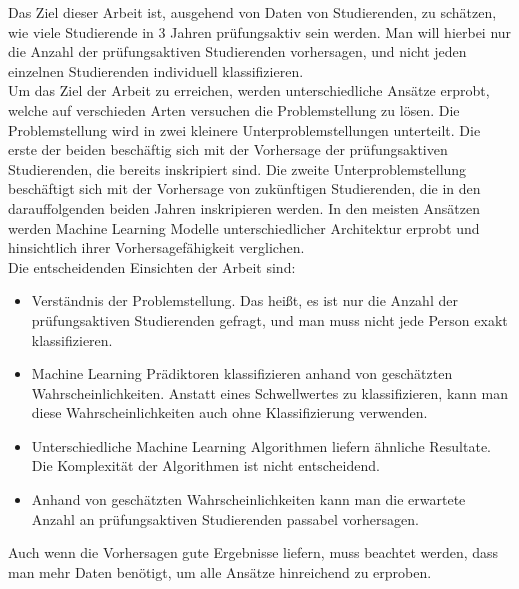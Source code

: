 

Das Ziel dieser Arbeit ist, ausgehend von Daten von Studierenden, zu sch\"atzen, wie viele
Studierende in 3 Jahren pr\"ufungsaktiv sein werden. Man will hierbei nur die Anzahl der pr\"ufungsaktiven Studierenden vorhersagen,
und nicht jeden einzelnen Studierenden individuell klassifizieren. \\

Um das Ziel der Arbeit zu erreichen, werden unterschiedliche Ans\"atze erprobt, welche auf verschieden Arten versuchen die Problemstellung zu l\"osen.
Die Problemstellung wird in zwei kleinere Unterproblemstellungen unterteilt. Die erste der beiden besch\"aftig sich mit der Vorhersage der pr\"ufungsaktiven Studierenden,
die bereits inskripiert sind. Die zweite Unterproblemstellung besch\"aftigt sich mit der Vorhersage von zuk\"unftigen Studierenden, die in den darauffolgenden beiden Jahren inskripieren werden.
In den meisten Ans\"atzen werden Machine Learning Modelle unterschiedlicher Architektur erprobt und hinsichtlich ihrer Vorhersagef\"ahigkeit
verglichen. \\

Die entscheidenden Einsichten der Arbeit sind:
\begin{itemize}
    \item Verst\"andnis der Problemstellung. Das hei{\ss}t, es ist nur die Anzahl der pr\"ufungsaktiven Studierenden gefragt, und man muss nicht jede Person exakt klassifizieren.
    \item Machine Learning Pr\"adiktoren klassifizieren anhand von gesch\"atzten Wahrscheinlichkeiten. Anstatt eines Schwellwertes zu klassifizieren,
          kann man diese Wahrscheinlichkeiten auch ohne Klassifizierung verwenden.
    \item Unterschiedliche Machine Learning Algorithmen liefern \"ahnliche Resultate. Die Komplexit\"at der Algorithmen ist nicht entscheidend.
    \item Anhand von gesch\"atzten Wahrscheinlichkeiten kann man die erwartete Anzahl an pr\"ufungsaktiven Studierenden passabel vorhersagen.
\end{itemize}

Auch wenn die Vorhersagen gute Ergebnisse liefern, muss beachtet werden, dass man mehr Daten ben\"otigt, um alle Ans\"atze hinreichend zu erproben.